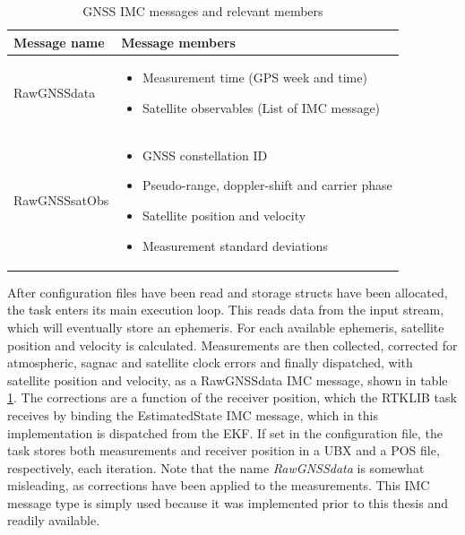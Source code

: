     \begin{table}[!htbp]
    \centering
    \begin{tabularx}{\textwidth}{ |l|X| }\hline
        \textbf{Message name}   & \textbf{Message members}  \\\hline
        RawGNSSdata & 
        \begin{minipage}[t]{0.7\textwidth}
            \begin{itemize}
                \item Measurement time (GPS week and time)
                \item Satellite observables (List of IMC message)
            \end{itemize}
        \end{minipage}\\\hline
        RawGNSSsatObs &
        \begin{minipage}[t]{0.7\textwidth}
            \begin{itemize}
                \item GNSS constellation ID
                \item Pseudo-range, doppler-shift and carrier phase
                \item Satellite position and velocity
                \item Measurement standard deviations
            \end{itemize}
        \end{minipage}\\\hline
    \end{tabularx}
    \caption{GNSS IMC messages and relevant members}
    \label{tab:imc-gnss}
    \end{table}
    
    After configuration files have been read and storage structs have been allocated, the task enters its main execution loop. This reads data from the input stream, which will eventually store an ephemeris. For each available ephemeris, satellite position and velocity is calculated. Measurements are then collected, corrected for atmospheric, sagnac and satellite clock errors and finally dispatched, with satellite position and velocity, as a RawGNSSdata IMC message, shown in table \ref{tab:imc-gnss}. The corrections are a function of the receiver position, which the RTKLIB task receives by binding the EstimatedState IMC message, which in this implementation is dispatched from the EKF. If set in the configuration file, the task stores both measurements and receiver position in a UBX and a POS file, respectively, each iteration. Note that the name \textit{RawGNSSdata} is somewhat misleading, as corrections have been applied to the measurements. This IMC message type is simply used because it was implemented prior to this thesis and readily available.
    
